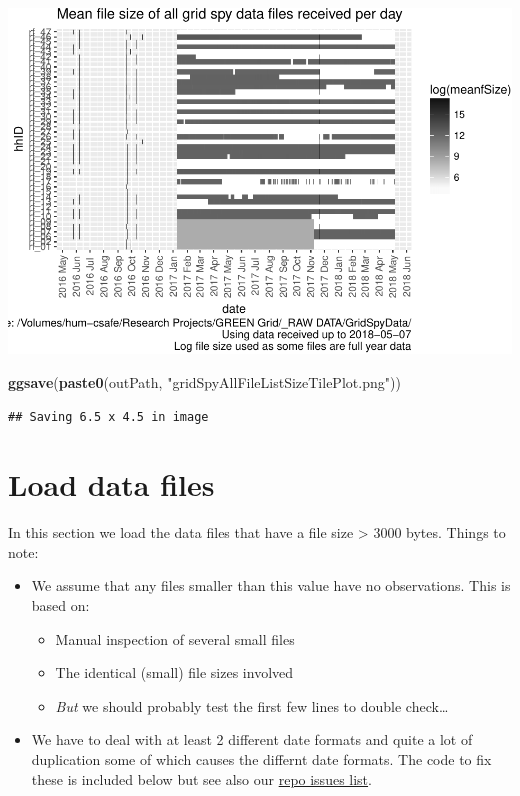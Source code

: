 \documentclass[]{article}
\newenvironment{Shaded}{\begin{snugshade}}{\end{snugshade}}
\newcommand{\KeywordTok}[1]{\textcolor[rgb]{0.13,0.29,0.53}{\textbf{#1}}}
\newcommand{\StringTok}[1]{\textcolor[rgb]{0.31,0.60,0.02}{#1}}
\newcommand{\NormalTok}[1]{#1}
\providecommand{\tightlist}{%
  \setlength{\itemsep}{0pt}\setlength{\parskip}{0pt}}
\begin{document}
\includegraphics{processNZGGElecCons1minData_files/figure-latex/allFileSizesPlot-1.pdf}

\begin{Shaded}
\begin{Highlighting}[]
\KeywordTok{ggsave}\NormalTok{(}\KeywordTok{paste0}\NormalTok{(outPath, }\StringTok{"gridSpyAllFileListSizeTilePlot.png"}\NormalTok{))}
\end{Highlighting}
\end{Shaded}

\begin{verbatim}
## Saving 6.5 x 4.5 in image
\end{verbatim}

\section{Load data files}\label{load-data-files}

In this section we load the data files that have a file size
\textgreater{} 3000 bytes. Things to note:

\begin{itemize}
\tightlist
\item
  We assume that any files smaller than this value have no observations.
  This is based on:

  \begin{itemize}
  \tightlist
  \item
    Manual inspection of several small files
  \item
    The identical (small) file sizes involved
  \item
    \emph{But} we should probably test the first few lines to double
    check\ldots{}
  \end{itemize}
\item
  We have to deal with at least 2 different date formats and quite a lot
  of duplication some of which causes the differnt date formats. The
  code to fix these is included below but see also our
  \href{https://git.soton.ac.uk/ba1e12/nzGREENGrid/issues?scope=all\&utf8=\%E2\%9C\%93\&state=all}{repo
  issues list}.
\end{itemize}
\end{document}
